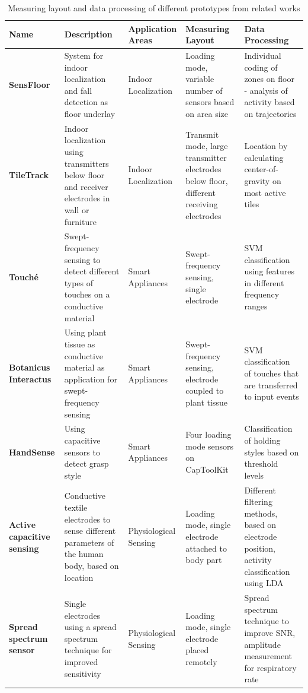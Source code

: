 \begin{table}[htbp]	
	\centering
  \footnotesize
  \caption{Measuring layout and data processing of different prototypes from related works}
    \begin{tabularx}{\linewidth}{Xp{3.5cm}Xp{3.5cm}p{3.5cm}}
    \toprule
    \textbf{Name} & \textbf{Description} & \textbf{Application Areas} & \textbf{Measuring Layout} & \textbf{Data Processing} \\
    \midrule
    \textbf{SensFloor \cite{lauterbach2009}} & System for indoor localization and fall detection as floor underlay & Indoor Localization & Loading mode, variable number of sensors based on area size & Individual coding of zones on floor - analysis of activity based on trajectories \\
    \textbf{TileTrack \cite{Valtonen2009a}} & Indoor localization using transmitters below floor and receiver electrodes in wall or furniture & Indoor Localization & Transmit mode, large transmitter electrodes below floor, different receiving electrodes & Location by calculating center-of-gravity on most active tiles \\
    \textbf{Touché \cite{Sato2012}} & Swept-frequency sensing to detect different types of touches on a conductive material & Smart Appliances & Swept-frequency sensing, single electrode & SVM classification using features in different frequency ranges \\
    \textbf{Botanicus Interactus \cite{poupyrev2012botanicus}} & Using plant tissue as conductive material as application for swept-frequency sensing & Smart Appliances & Swept-frequency sensing, electrode coupled to plant tissue & SVM classification of touches that are transferred to input events \\
    \textbf{HandSense \cite{wimmer2009handsense}} & Using capacitive sensors to detect grasp style & Smart Appliances & Four loading mode sensors on CapToolKit & Classification of holding styles based on threshold levels \\
    \textbf{Active capacitive sensing \cite{cheng2010active}} & Conductive textile electrodes to sense different parameters of the human body, based on location & Physiological Sensing & Loading mode, single electrode attached to body part & Different filtering methods, based on electrode position, activity classification using LDA \\
    \textbf{Spread spectrum sensor \cite{MacLachlan2004}} & Single electrodes using a spread spectrum technique for improved sensitivity & Physiological Sensing & Loading mode, single electrode placed remotely & Spread spectrum technique to improve SNR, amplitude measurement for respiratory rate \\

\end{tabularx}
\end{table}
